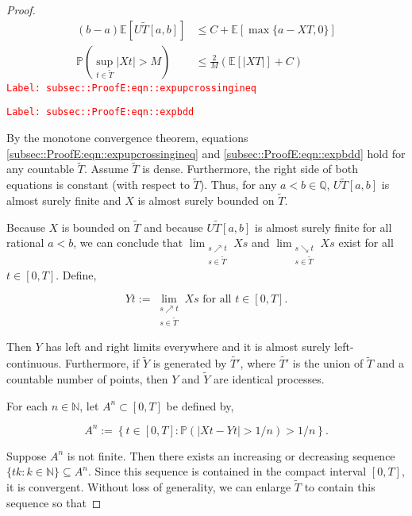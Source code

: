 \documentclass[12pt]{article}
\newcommand{\mb}{\mathbb}
\newcommand{\te}{\text}
\newcommand{\tr}{\textcolor{red}}
\newcommand{\labe}[1]{\tr{\texttt{Label: #1}}}
\newcommand{\ind}{\hspace{24pt}}
\newcommand{\pr}{\mb{P}}							%
\newcommand{\ex}[1]{\mb{E}\left[#1\right]}			%
\newcommand{\T}{T}								%
\renewcommand{\t}{t}							%
\renewcommand{\tt}{s}							%
\newcommand{\X}{X}								%
\newcommand{\const}{C}							%
\newcommand{\sln}[1]{^{#1}}						%
\newcommand{\alt}[1]{\widetilde{#1}}			%
\newcommand{\XX}{Y}								%
\renewcommand{\it}{k}							%
\newcommand{\Tset}{\alt{T}}						%
\newcommand{\typset}{A}							%
\newcommand{\upcrs}{U}							%
\begin{document}
\begin{proof}
\begin{align}
(b-a)\ex{\upcrs{\Tset}[a,b]} &\leq \const{} + \ex{\max\{a-\X{}{\T},0\}}
\label{subsec::ProofE:eqn::expupcrossingineq}\\
\pr\left(\sup_{\t\in\Tset} |\X{}{\t}| > M\right) &\leq \frac{2}{M}\left(\ex{|\X{}{\T}|} + \const{}\right)
\label{subsec::ProofE:eqn::expbdd}
\end{align}
\labe{subsec::ProofE:eqn::expupcrossingineq}

\labe{subsec::ProofE:eqn::expbdd}

By the monotone convergence theorem, equations \eqref{subsec::ProofE:eqn::expupcrossingineq} and \eqref{subsec::ProofE:eqn::expbdd} hold for any countable \(\Tset\). Assume \(\Tset\) is dense. Furthermore, the right side of both equations is constant (with respect to \(\Tset\)). Thus, for any \(a < b \in \mb{Q}\), \(\upcrs{\Tset}[a,b]\) is almost surely finite and \(\X{}{}\) is almost surely bounded on \(\Tset\).

\ind Because \(\X{}{}\) is bounded on \(\Tset\) and because \(\upcrs{\Tset}[a,b]\) is almost surely finite for all rational \(a < b\), we can conclude that \(\lim_{\substack{\tt \nearrow \t\\ \tt \in \Tset}} \X{}{\tt}\) and \(\lim_{\substack{\tt \searrow \t\\ \tt \in \Tset}} \X{}{\tt}\) exist for all \(\t \in [0,\T]\). Define,

\[\XX{}{\t} := \lim_{\substack{\tt \nearrow \t\\\tt \in \Tset}} \X{}{\tt}\te{ for all } \t \in [0,\T].\]

Then \(\XX{}{}\) has left and right limits everywhere and it is almost surely left-continuous. Furthermore, if \(\alt{\XX{}{}}\) is generated by \(\alt{T'}\), where \(\alt{T'}\) is the union of \(\Tset\) and a countable number of points, then \(\XX{}{}\) and \(\alt{\XX{}{}}\) are identical processes. 

\ind For each \(n \in \mb{N}\), let \(\typset\sln{n} \subset [0,\T]\) be defined by,

\[\typset\sln{n} := \left\{\t\in [0,\T]: \pr\left(|\X{}{\t} - \XX{}{\t}| > 1/n\right) > 1/n\right\}.\] 

Suppose \(\typset\sln{n}\) is not finite. Then there exists an increasing or decreasing sequence \(\{\t{\it}:\it\in \mb{N}\}\subseteq \typset\sln{n}\). Since this sequence is contained in the compact interval \([0,\T]\), it is convergent. Without loss of generality, we can enlarge \(\Tset\) to contain this sequence so that


\end{proof}
\end{document}
